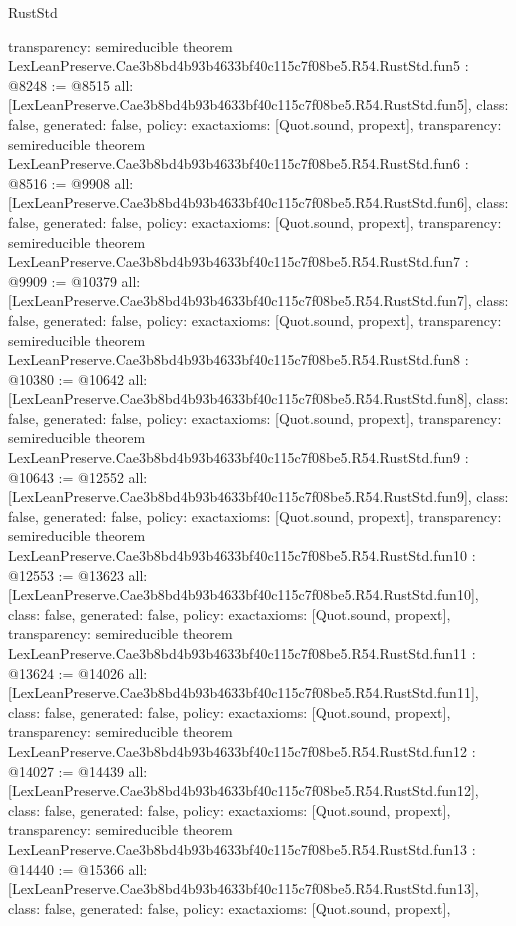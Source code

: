 \begin{lexlean}{RustStd}
\begin{coremodule}
{  transparency: semireducible
}
theorem LexLeanPreserve.Cae3b8bd4b93b4633bf40c115c7f08be5.R54.RustStd.fun5 : @8248 := @8515 {
  all: [LexLeanPreserve.Cae3b8bd4b93b4633bf40c115c7f08be5.R54.RustStd.fun5],
  class: false,
  generated: false,
  policy: exact{axioms: [Quot.sound, propext]},
  transparency: semireducible
}
theorem LexLeanPreserve.Cae3b8bd4b93b4633bf40c115c7f08be5.R54.RustStd.fun6 : @8516 := @9908 {
  all: [LexLeanPreserve.Cae3b8bd4b93b4633bf40c115c7f08be5.R54.RustStd.fun6],
  class: false,
  generated: false,
  policy: exact{axioms: [Quot.sound, propext]},
  transparency: semireducible
}
theorem LexLeanPreserve.Cae3b8bd4b93b4633bf40c115c7f08be5.R54.RustStd.fun7 : @9909 := @10379 {
  all: [LexLeanPreserve.Cae3b8bd4b93b4633bf40c115c7f08be5.R54.RustStd.fun7],
  class: false,
  generated: false,
  policy: exact{axioms: [Quot.sound, propext]},
  transparency: semireducible
}
theorem LexLeanPreserve.Cae3b8bd4b93b4633bf40c115c7f08be5.R54.RustStd.fun8 : @10380 := @10642 {
  all: [LexLeanPreserve.Cae3b8bd4b93b4633bf40c115c7f08be5.R54.RustStd.fun8],
  class: false,
  generated: false,
  policy: exact{axioms: [Quot.sound, propext]},
  transparency: semireducible
}
theorem LexLeanPreserve.Cae3b8bd4b93b4633bf40c115c7f08be5.R54.RustStd.fun9 : @10643 := @12552 {
  all: [LexLeanPreserve.Cae3b8bd4b93b4633bf40c115c7f08be5.R54.RustStd.fun9],
  class: false,
  generated: false,
  policy: exact{axioms: [Quot.sound, propext]},
  transparency: semireducible
}
theorem LexLeanPreserve.Cae3b8bd4b93b4633bf40c115c7f08be5.R54.RustStd.fun10 : @12553 := @13623 {
  all: [LexLeanPreserve.Cae3b8bd4b93b4633bf40c115c7f08be5.R54.RustStd.fun10],
  class: false,
  generated: false,
  policy: exact{axioms: [Quot.sound, propext]},
  transparency: semireducible
}
theorem LexLeanPreserve.Cae3b8bd4b93b4633bf40c115c7f08be5.R54.RustStd.fun11 : @13624 := @14026 {
  all: [LexLeanPreserve.Cae3b8bd4b93b4633bf40c115c7f08be5.R54.RustStd.fun11],
  class: false,
  generated: false,
  policy: exact{axioms: [Quot.sound, propext]},
  transparency: semireducible
}
theorem LexLeanPreserve.Cae3b8bd4b93b4633bf40c115c7f08be5.R54.RustStd.fun12 : @14027 := @14439 {
  all: [LexLeanPreserve.Cae3b8bd4b93b4633bf40c115c7f08be5.R54.RustStd.fun12],
  class: false,
  generated: false,
  policy: exact{axioms: [Quot.sound, propext]},
  transparency: semireducible
}
theorem LexLeanPreserve.Cae3b8bd4b93b4633bf40c115c7f08be5.R54.RustStd.fun13 : @14440 := @15366 {
  all: [LexLeanPreserve.Cae3b8bd4b93b4633bf40c115c7f08be5.R54.RustStd.fun13],
  class: false,
  generated: false,
  policy: exact{axioms: [Quot.sound, propext]},
}
\end{coremodule}
\end{lexlean}
